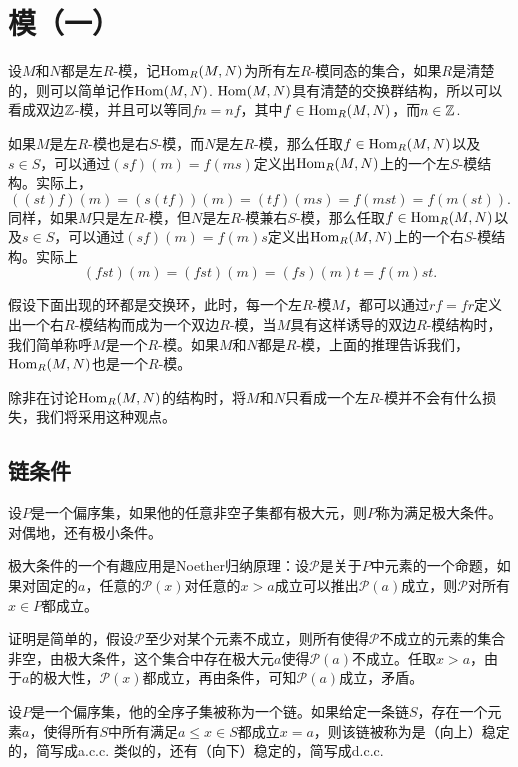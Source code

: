 \chapter{模（一）}

设$M$和$N$都是左$R$-模，记$\operatorname{Hom}_R(M,N)$为所有左$R$-模同态的集合，如果$R$是清楚的，则可以简单记作$\operatorname{Hom}(M,N)$. $\operatorname{Hom}(M,N)$具有清楚的交换群结构，所以可以看成双边$\mathbb{Z}$-模，并且可以等同$fn=nf$，其中$f\in \operatorname{Hom}_R(M,N)$，而$n\in \mathbb{Z}$.

如果$M$是左$R$-模也是右$S$-模，而$N$是左$R$-模，那么任取$f\in \operatorname{Hom}_R(M,N)$以及$s\in S$，可以通过$(sf)(m)=f(ms)$定义出$\operatorname{Hom}_R(M,N)$上的一个左$S$-模结构。实际上，
\[
	((st)f)(m)=(s(tf))(m)=(tf)(ms)=f(mst)=f(m(st)).
\]
同样，如果$M$只是左$R$-模，但$N$是左$R$-模兼右$S$-模，那么任取$f\in \operatorname{Hom}_R(M,N)$以及$s\in S$，可以通过$(sf)(m)=f(m)s$定义出$\operatorname{Hom}_R(M,N)$上的一个右$S$-模结构。实际上
\[
	(fst)(m)=(fst)(m)=(fs)(m)t=f(m)st.
\]

假设下面出现的环都是交换环，此时，每一个左$R$-模$M$，都可以通过$rf=fr$定义出一个右$R$-模结构而成为一个双边$R$-模，当$M$具有这样诱导的双边$R$-模结构时，我们简单称呼$M$是一个$R$-模。如果$M$和$N$都是$R$-模，上面的推理告诉我们，$\operatorname{Hom}_R(M,N)$也是一个$R$-模。

除非在讨论$\operatorname{Hom}_R(M,N)$的结构时，将$M$和$N$只看成一个左$R$-模并不会有什么损失，我们将采用这种观点。

\section{链条件}

\para 设$P$是一个偏序集，如果他的任意非空子集都有极大元，则$P$称为满足极大条件。对偶地，还有极小条件。

极大条件的一个有趣应用是Noether归纳原理：设$\mathcal{P}$是关于$P$中元素的一个命题，如果对固定的$a$，任意的$\mathcal{P}(x)$对任意的$x>a$成立可以推出$\mathcal{P}(a)$成立，则$\mathcal{P}$对所有$x\in P$都成立。

证明是简单的，假设$\mathcal{P}$至少对某个元素不成立，则所有使得$\mathcal{P}$不成立的元素的集合非空，由极大条件，这个集合中存在极大元$a$使得$\mathcal{P}(a)$不成立。任取$x>a$，由于$a$的极大性，$\mathcal{P}(x)$都成立，再由条件，可知$\mathcal{P}(a)$成立，矛盾。

\para 设$P$是一个偏序集，他的全序子集被称为一个链。如果给定一条链$S$，存在一个元素$a$，使得所有$S$中所有满足$a\leq x\in S$都成立$x=a$，则该链被称为是（向上）稳定的，简写成a.c.c. 类似的，还有（向下）稳定的，简写成d.c.c.

